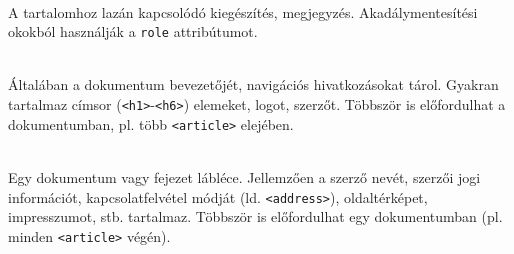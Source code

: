\begin{frame}
  \begin{description}[m]
    \item[\texttt{<aside>}] \hfill \\ A tartalomhoz lazán kapcsolódó kiegészítés, megjegyzés. Akadálymentesítési okokból használják a \texttt{role} attribútumot.
    \item[\texttt{<header>}] \hfill \\ Általában a dokumentum bevezetőjét, navigációs hivatkozásokat tárol. Gyakran tartalmaz címsor (\texttt{<h1>}-\texttt{<h6>}) elemeket, logot, szerzőt. Többször is előfordulhat a dokumentumban, pl. több \texttt{<article>} elejében.
    \item[\texttt{<footer>}] \hfill \\ Egy dokumentum vagy fejezet lábléce. Jellemzően a szerző nevét, szerzői jogi információt, kapcsolatfelvétel módját (ld. \texttt{<address>}), oldaltérképet, impresszumot, stb. tartalmaz. Többször is előfordulhat egy dokumentumban (pl. minden \texttt{<article>} végén).
  \end{description} 
\end{frame}

\begin{frame}
  \begin{exampleblock}{}
    \footnotesize
    
  \end{exampleblock}
\end{frame}

\begin{frame}
  \begin{exampleblock}{}
    \footnotesize
    
    
  \end{exampleblock}
\end{frame}

\begin{frame}
  \begin{exampleblock}{}
    \footnotesize
    
  \end{exampleblock}
\end{frame}

